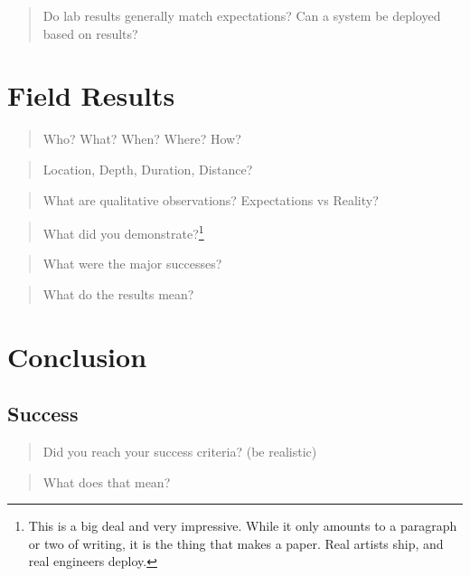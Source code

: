 \documentclass[
  10pt,
  draftcls,
  technote,
  letterpaper,
  oneside,
  onecolumn]{IEEEtran}
\begin{document}
\begin{quote}
Do lab results generally match expectations? Can a system be deployed
based on results?
\end{quote}

\hypertarget{field-results}{%
\section{Field Results}\label{field-results}}

\begin{quote}
Who? What? When? Where? How?
\end{quote}

\begin{quote}
Location, Depth, Duration, Distance?
\end{quote}

\begin{quote}
What are qualitative observations? Expectations vs Reality?
\end{quote}

\begin{quote}
What did you demonstrate?\footnote{This is a big deal and very
  impressive. While it only amounts to a paragraph or two of writing, it
  is the thing that makes a paper. Real artists ship, and real engineers
  deploy.}
\end{quote}

\begin{quote}
What were the major successes?
\end{quote}

\begin{quote}
What do the results mean?
\end{quote}

\hypertarget{conclusion}{%
\section{Conclusion}\label{conclusion}}

\hypertarget{success}{%
\subsection{Success}\label{success}}

\begin{quote}
Did you reach your success criteria? (be realistic)
\end{quote}

\begin{quote}
What does that mean?
\end{quote}
\end{document}
